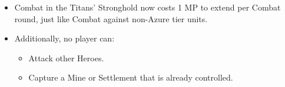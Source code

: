\begin{multicols*}{2}
\begin{itemize}
    \item Combat in the Titans' Stronghold now costs 1 MP to extend per Combat round, just like Combat against non-Azure tier units.
    \item Additionally, no player can:
    \begin{itemize}
        \item Attack other Heroes.
        \item Capture a Mine or Settlement that is already controlled.
    \end{itemize}
\end{itemize}

\end{multicols*}

\newpage


